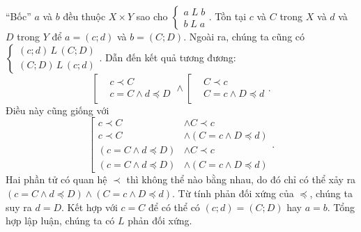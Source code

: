 ``Bốc'' $a$ và $b$ đều thuộc $X \times Y$ sao cho $\begin{cases}
   a \; L \; b\\
   b\;L\;a
\end{cases}$. Tồn tại $c$ và $C$ trong $X$ và $d$ và $D$ trong $Y$ để $a = (c; d)$ và $b = (C; D)$. Ngoài ra, chúng ta cũng có $\begin{cases}
   (c; d)\,L\,(C; D) \\
   (C; D)\,L\,(c; d)
\end{cases}$. Dẫn đến kết quả tương đương:
\begin{equation*}
   \left[\begin{aligned}
      &c \prec C \\
      &c = C \land d \preccurlyeq D
   \end{aligned}\right. \land \left[\begin{aligned}
      &C \prec c \\
      &C = c \land D \preccurlyeq d
   \end{aligned}\right..
\end{equation*}
Điều này cũng giống với
\begin{equation*}
   \left[\begin{aligned}
      c \prec C &\land C \prec c \\
      c \prec C &\land (C = c \land D \preccurlyeq d) \\
      (c = C \land d \preccurlyeq D) &\land C \prec c \\
      (c = C \land d \preccurlyeq D) &\land (C = c \land D \preccurlyeq d)
   \end{aligned}\right..
\end{equation*}
Hai phần tử có quan hệ $\prec$ thì không thể nào bằng nhau, do đó chỉ có thể xảy ra $(c = C \land d \preccurlyeq D) \land (C = c \land D \preccurlyeq d)$. Từ tính phản đối xứng của $\preccurlyeq$, chúng ta suy ra $d = D$. Kết hợp với $c = C$ để có thể có $(c; d) = (C; D)$ hay $a = b$. Tổng hợp lập luận, chúng ta có $L$ phản đối xứng.

